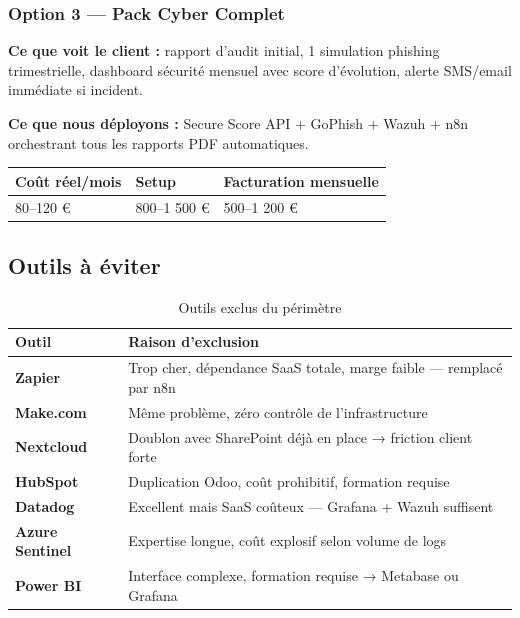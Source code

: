 \subsubsection{Option 3 — Pack Cyber Complet}

\textbf{Ce que voit le client :} rapport d'audit initial, 1 simulation phishing trimestrielle, dashboard sécurité mensuel avec score d'évolution, alerte SMS/email immédiate si incident.

\textbf{Ce que nous déployons :} Secure Score API + GoPhish + Wazuh + n8n orchestrant tous les rapports PDF automatiques.

\begin{table}[htbp]
  \centering\renewcommand{\arraystretch}{1.3}
  \begin{tabularx}{\textwidth}{X X X}
    \toprule
    \textbf{Coût réel/mois} & \textbf{Setup} & \textbf{Facturation mensuelle} \\
    \midrule
    80–120 € & 800–1 500 € & 500–1 200 € \\
    \bottomrule
  \end{tabularx}
\end{table}

\subsection{Outils à éviter}

\begin{table}[htbp]
  \centering
  \caption{Outils exclus du périmètre}
  \renewcommand{\arraystretch}{1.4}
  \begin{tabularx}{\textwidth}{>{\bfseries}p{3cm} X}
    \toprule
    \rowcolor{tabheader}
    \color{white}Outil & \color{white}Raison d'exclusion \\
    \midrule
    Zapier & Trop cher, dépendance SaaS totale, marge faible — remplacé par n8n \\
    \rowcolor{rowgray}
    Make.com & Même problème, zéro contrôle de l'infrastructure \\
    Nextcloud & Doublon avec SharePoint déjà en place → friction client forte \\
    \rowcolor{rowgray}
    HubSpot & Duplication Odoo, coût prohibitif, formation requise \\
    Datadog & Excellent mais SaaS coûteux — Grafana + Wazuh suffisent \\
    \rowcolor{rowgray}
    Azure Sentinel & Expertise longue, coût explosif selon volume de logs \\
    Power BI & Interface complexe, formation requise → Metabase ou Grafana \\
    \bottomrule
  \end{tabularx}
\end{table}


